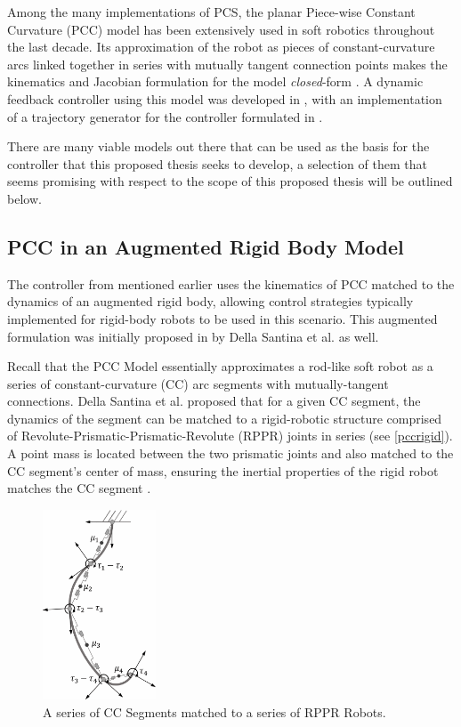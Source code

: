 Among the many implementations of PCS, the planar Piece-wise Constant Curvature (PCC) model has been extensively used in soft robotics throughout the last decade. Its approximation of the robot as pieces of constant-curvature arcs linked together in series with mutually tangent connection points makes the kinematics and Jacobian formulation for the model \textit{closed}-form \cite{websteriii_design_2010}. A dynamic feedback controller using this model was developed in \cite{della_santina_model-based_2020}, with an implementation of a trajectory generator for the controller formulated in \cite{dickson_real-time_2025}. 

There are many viable models out there that can be used as the basis for the controller that this proposed thesis seeks to develop, a selection of them that seems promising with respect to the scope of this proposed thesis will be outlined below.
\subsection{PCC in an Augmented Rigid Body Model} \label{augmentedpccdef}
The controller from \cite{della_santina_model-based_2020} mentioned earlier uses the kinematics of PCC matched to the dynamics of an augmented rigid body, allowing control strategies typically implemented for rigid-body robots to be used in this scenario. This augmented formulation was initially proposed in \cite{della_santina_dynamic_2018} by Della Santina et al. as well. 

Recall that the PCC Model essentially approximates a rod-like soft robot as a series of constant-curvature (CC) arc segments with mutually-tangent connections. Della Santina et al. proposed that for a given CC segment, the dynamics of the segment can be matched to a rigid-robotic structure comprised of Revolute-Prismatic-Prismatic-Revolute (RPPR) joints in series (see \autoref{pccrigid}). A point mass is located between the two prismatic joints and also matched to the CC segment's center of mass, ensuring the inertial properties of the rigid robot matches the CC segment \cite{della_santina_dynamic_2018}.

\begin{figure}[h!]
    \centering
    \includegraphics[width=0.3\textwidth]{graphics/pccrigid.png}
    \caption{A series of CC Segments matched to a series of RPPR Robots. }
    \label{pccrigid}
\end{figure}

